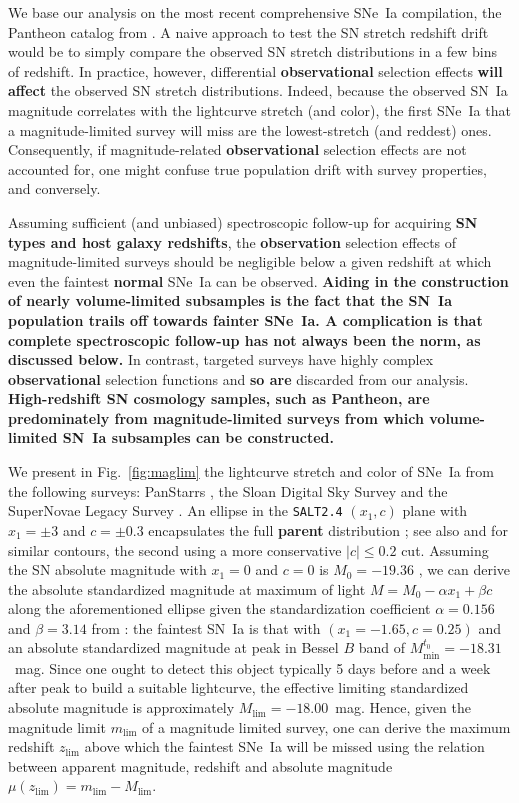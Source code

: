 \documentclass[referee]{aa}
\begin{document}
We base our analysis on the most recent comprehensive SNe~Ia compilation, the
Pantheon catalog from \cite{scolnic2018a}. A naive approach to test the SN
stretch redshift drift would be to simply compare the observed SN stretch
distributions in a few bins of redshift. In practice, however, differential
\textbf{observational} selection effects \textbf{will affect} the observed SN
stretch distributions. Indeed, because the observed SN~Ia magnitude correlates
with the lightcurve stretch (and color), the first SNe~Ia that a
magnitude-limited survey will miss are the lowest-stretch (and reddest) ones.
Consequently, if magnitude-related \textbf{observational} selection effects are
not accounted for, one might confuse true population drift with survey
properties, and conversely.

Assuming sufficient (and unbiased) spectroscopic follow-up for acquiring
\textbf{SN types and host galaxy redshifts}, the \textbf{observation} selection
effects of magnitude-limited surveys should be negligible below a given redshift
at which even the faintest \textbf{normal} SNe~Ia can be observed.
\textbf{Aiding in the construction of nearly volume-limited subsamples is the
    fact that the SN~Ia population trails off towards fainter SNe~Ia. A
    complication is that complete spectroscopic follow-up has not always been
    the norm, as discussed below.} In contrast, targeted surveys have highly
    complex \textbf{observational} selection functions and \textbf{so are}
    discarded from our analysis. \textbf{High-redshift SN cosmology samples,
    such as Pantheon, are predominately from magnitude-limited surveys from
which volume-limited SN~Ia subsamples can be constructed.}

We present in Fig.~\ref{fig:maglim} the lightcurve stretch and color of SNe~Ia
from the following surveys: PanStarrs \citep[PS1][]{rest2014}, the Sloan Digital
Sky Survey \citep[SDSS][]{frieman2008} and the SuperNovae Legacy Survey
\citep[SNLS][]{astier2006}. An ellipse in the \textsc{\texttt{SALT2.4}} $(x_1,
c)$ plane with $x_1 = \pm 3$ and $c = \pm 0.3$ encapsulates the full
\textbf{parent} distribution \citep{guy2007, betoule2014}; see also
\citet{bazin2011} and \citet{campbell2013} for similar contours, the second
using a more conservative $|c| \leq 0.2$ cut. Assuming the SN absolute magnitude
with $x_1=0$ and $c=0$ is $M_0=-19.36$ \citep{kessler2009,scolnic2014}, we can
derive the absolute standardized magnitude at maximum of light $M = M_0 - \alpha
x_1 + \beta c$ along the aforementioned ellipse given the standardization
coefficient $\alpha=0.156$ and $\beta=3.14$ from \cite{scolnic2018a}: the
faintest SN~Ia is that with $(x_1=-1.65, c=0.25)$ and an absolute standardized
magnitude at peak in Bessel $B$ band of $M^{t_0}_{\min} = -18.31$~mag. Since one
ought to detect this object typically 5 days before and a week after peak to
build a suitable lightcurve, the effective limiting standardized absolute
magnitude is approximately $M_{\lim} = -18.00$~mag. Hence, given the magnitude
limit $m_{\lim}$ of a magnitude limited survey, one can derive the maximum
redshift $z_{\lim}$ above which the faintest SNe~Ia will be missed using the
relation between apparent magnitude, redshift and absolute magnitude
$\mu(z_{\lim}) = m_{\lim} - M_{\lim}$.
\end{document}
